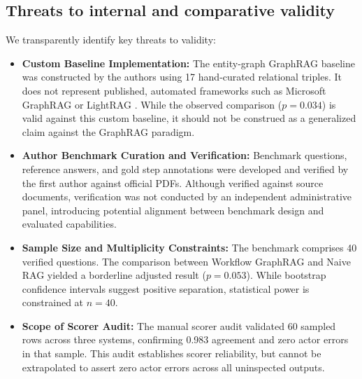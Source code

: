 \documentclass[preprint,10pt]{elsarticle}
\begin{document}
\subsection{Threats to internal and comparative validity}
We transparently identify key threats to validity:
\begin{itemize}[leftmargin=*]
\item \textbf{Custom Baseline Implementation:} The entity-graph GraphRAG baseline was constructed by the authors using 17 hand-curated relational triples. It does not represent published, automated frameworks such as Microsoft GraphRAG \cite{edge2024graphrag} or LightRAG \cite{guo2024lightrag}. While the observed comparison ($p=0.034$) is valid against this custom baseline, it should not be construed as a generalized claim against the GraphRAG paradigm.
\item \textbf{Author Benchmark Curation and Verification:} Benchmark questions, reference answers, and gold step annotations were developed and verified by the first author against official PDFs. Although verified against source documents, verification was not conducted by an independent administrative panel, introducing potential alignment between benchmark design and evaluated capabilities.
\item \textbf{Sample Size and Multiplicity Constraints:} The benchmark comprises 40 verified questions. The comparison between Workflow GraphRAG and Naive RAG yielded a borderline adjusted result ($p = 0.053$). While bootstrap confidence intervals suggest positive separation, statistical power is constrained at $n=40$.
\item \textbf{Scope of Scorer Audit:} The manual scorer audit validated 60 sampled rows across three systems, confirming 0.983 agreement and zero actor errors in that sample. This audit establishes scorer reliability, but cannot be extrapolated to assert zero actor errors across all uninspected outputs.
\end{itemize}
\end{document}
